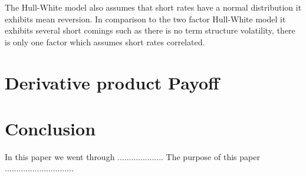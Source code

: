 \documentclass{article}
\begin{document}
The Hull-White model also assumes that short rates have a normal distribution it exhibits mean reversion.  In comparison to the two factor Hull-White model it exhibits several short comings such as there is no term structure volatility, there is only one factor which assumes short rates correlated.
\section{Derivative product Payoff}


\section{Conclusion}

In this paper we went through ....................  The purpose of this paper ..............................

\newpage
\section*{} \label{bibsection}
\end{document}
